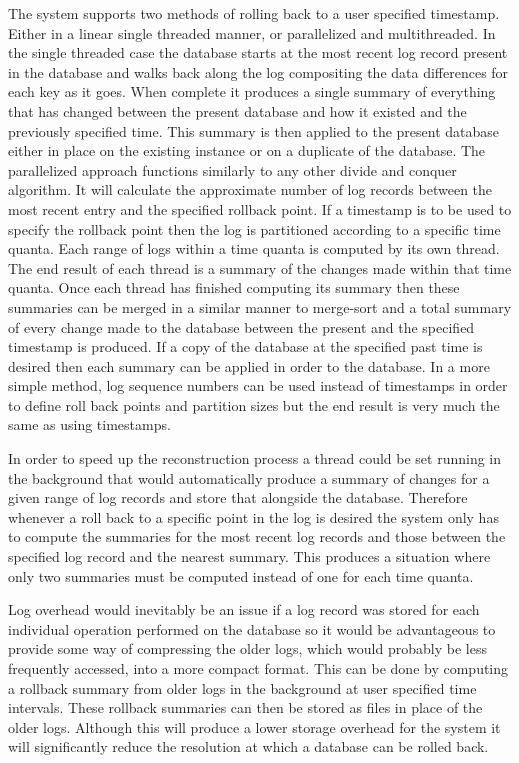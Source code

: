 \documentclass{article}
\begin{document}
The system supports two methods of rolling back to a user specified timestamp. Either in a linear single threaded manner, or parallelized and multithreaded. In the single threaded case the database starts at the most recent log record present in the database and walks back along the log compositing the data differences for each key as it goes. When complete it produces a single summary of everything that has changed between the present database and how it existed and the previously specified time. This summary is then applied to the present database either in place on the existing instance or on a duplicate of the database. The parallelized approach functions similarly to any other divide and conquer algorithm. It will calculate the approximate number of log records between the most recent entry and the specified rollback point. If a timestamp is to be used to specify the rollback point then the log is partitioned according to a specific time quanta. Each range of logs within a time quanta is computed by its own thread. The end result of each thread is a summary of the changes made within that time quanta. Once each thread has finished computing its summary then these summaries can be merged in a similar manner to merge-sort and a total summary of every change made to the database between the present and the specified timestamp is produced. If a copy of the database at the specified past time is desired then each summary can be applied in order to the database. In a more simple method, log sequence numbers can be used instead of timestamps in order to define roll back points and partition sizes  but the end result is very much the same as using timestamps.

In order to speed up the reconstruction process a thread could be set running in the background that would automatically produce a summary of changes for a given range of log records and store that alongside the database. Therefore whenever a roll back to a specific point in the log is desired the system only has to compute the summaries for the most recent log records and those between the specified log record and the nearest summary. This produces a situation where only two summaries must be computed instead of one for each time quanta.

Log overhead would inevitably be an issue if a log record was stored for each individual operation performed on the database so it would be advantageous to provide some way of compressing the older logs, which would probably be less frequently accessed, into a more compact format. This can be done by computing a rollback summary from older logs in the background at user specified time intervals. These rollback summaries can then be stored as files in place of the older logs. Although this will produce a lower storage overhead for the system it will significantly reduce the resolution at which a database can be rolled back.
\end{document}
